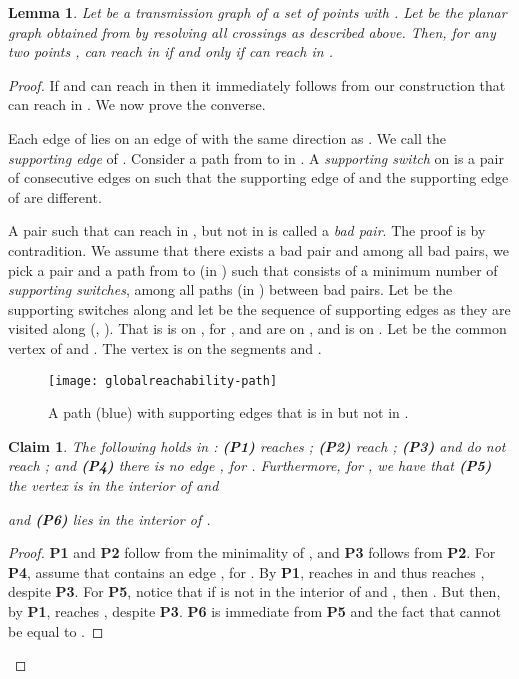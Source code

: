 \documentclass[11pt,a4paper]{paper}
\newtheorem{claim}[theorem]{Claim}
\newtheorem{lemma}[theorem]{Lemma}
\begin{document}
\begin{lemma}
\label{lem:globalreachability}
Let  be a transmission graph of a set  of points with . Let 
be the planar graph obtained from  by resolving all crossings as described above. Then,
for any two points  ,  can reach  in  if and only if 
can reach  in .
\end{lemma}

\begin{proof}
If  and can reach  in  then it immediately follows from our construction that  can reach
 in . We now prove the converse.

Each edge  of  lies on an edge  of  with the
same direction as . We call  the \emph{supporting edge} of .
Consider a path  from  to  in .
A \emph{supporting switch} on  is a pair of consecutive edges 
 on 
such that the supporting edge of  and the supporting edge of  are different.

A pair  such that  can reach
 in , but not in  is called a
\emph{bad pair}.
The proof is by contradition. We assume that there exists a bad pair and  among all bad pairs,
we pick a pair 
and a path  from  to  (in ) such that
 consists of  a
minimum number of \emph{supporting switches}, among all paths (in ) between bad pairs.
Let  be the supporting switches 
along  and let
  be the
sequence of supporting edges as they are visited along
 (, ).
That is  is on , for ,  and  are on , and
 is on .
Let  be the common vertex of  and . The vertex  is on the segments  and
.

\begin{figure}[htb]
\centering
\texttt{[image: globalreachability-path]}
\caption{A path (blue) with  supporting edges that is in
 but not in .}
\label{fig:globalreachability-path}
\end{figure}

\begin{claim}
The following holds in :
\textbf{(P1)}  reaches ;
\textbf{(P2)}  reach ;
\textbf{(P3)}   and  do not reach ; and
\textbf{(P4)} there is no edge ,
for .
Furthermore, for , we have that
\textbf{(P5)}
the vertex  is in the interior of
 and

and \textbf{(P6)}  lies in the interior of
.
\end{claim}

\begin{proof}
\textbf{P1} and \textbf{P2} follow from the minimality of ,
and \textbf{P3} follows from \textbf{P2}.
For \textbf{P4}, assume
that  contains an edge , for .
By \textbf{P1},  reaches  in  and thus  reaches ,
despite \textbf{P3}.
For \textbf{P5}, notice that if  is not in the interior of 
 and
, then
. But then, by \textbf{P1},  reaches
, despite \textbf{P3}.
\textbf{P6}
is immediate from \textbf{P5} and the fact that 
 cannot be equal to .
\end{proof}


\end{proof}
\end{document}
